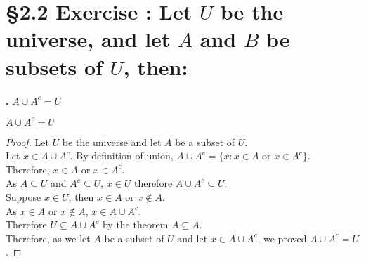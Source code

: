 \documentclass[a4paper,11pt]{article}
\begin{document}
\newpage

\setcounter{ProblemCounter}{8}
\setcounter{SubsectionCounter}{2}
\section*{\S 2.2 Exercise : Let \(U\) be the universe, and let \(A\) and \(B\) be subsets of \(U\), then: }
\textbf{.}
\(A \cup A^c = U\)
\begin{theorem5}
\(A \cup A^c = U\)
\begin{proof}
Let \(U\) be the universe and let \(A\) be a subset of \(U\).\\
Let \(x \in A \cup A^c\). By definition of union, \(A \cup A^c = \{x: x \in A \text{ or } x \in A^c 
\}\).\\
Therefore, \(x \in A\) or \(x \in A^c\).\\
As \(A \subseteq U\) and \(A^c \subseteq U\), \(x \in U\) therefore \(A \cup A^c \subseteq 
U\).\\
Suppose \(x \in U\), then \(x \in A\) or \(x \notin A\).\\
As \(x \in A \text{ or } x \notin A\), \(x \in A \cup A^c\).\\
Therefore \(U \subseteq A \cup A^c\) by the theorem \(A \subseteq A\).\\
Therefore, as we let \(A\) be a subset of \(U\) and let \(x \in A \cup A^c\), we 
proved \(A \cup A^c = U\).
\end{proof}
\end{theorem5}

\newpage

\setcounter{ProblemCounter}{8}
\setcounter{SubsectionCounter}{4}
\end{document}
